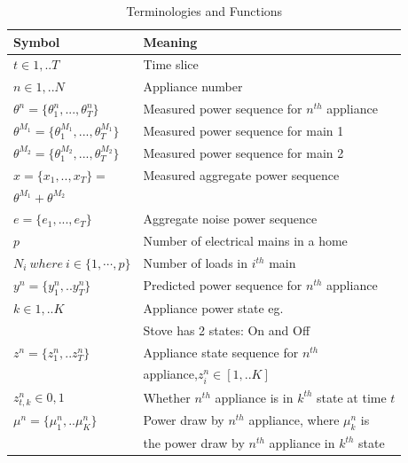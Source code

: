 \documentclass[conference]{IEEEtran}
\begin{document}
\begin{table}[ht!]
\vspace{-12pt}
\caption{Terminologies and Functions}
\vspace{-8pt}
\label{tab:terms}
\begin{tabular}{|l|l|}
\hline
Symbol&Meaning\\
\hline
$t\in {1,..T}$& Time slice\\
\hline
$n\in{1,..N}$ & Appliance number\\
\hline
$\theta^n=\{\theta_1^n,...,\theta_T^n\}$ & Measured power sequence for $n^{th}$ appliance\\
\hline
$\theta^{M_1}=\{\theta_1^{M_1},...,\theta_T^{M_1}\}$ & Measured power sequence for main 1\\[0.1cm]
\hline
$\theta^{M_2}=\{\theta_1^{M_2},...,\theta_T^{M_2}\}$ & Measured power sequence for main 2\\[0.1cm]
\hline
$x=\{ x_1,..,x_T\}=$ & Measured aggregate power sequence\\[0.1cm]
$\theta^{M_1}+\theta^{M_2}$ &\\
\hline
$e=\{e_1,...,e_T\}$ & Aggregate noise power sequence\\
\hline
$p$ & Number of electrical mains in a home\\
\hline
$N_i \:where\:i \in \{1,\cdots ,p\}$ & Number of loads in $i^{th}$ main\\
\hline
$y^n=\{y_1^n,..y_T^n\}$ & Predicted power sequence for $n^{th}$ appliance\\[0.1cm]
\hline
$k\in {1,..K}$ & Appliance power state eg. \\
&Stove has 2 states: On and Off\\[0.1cm]
\hline
$z^n=\{z_1^n,..z_T^n\}$ & Appliance state sequence for $n^{th}$ \\[0.1cm]
& appliance,$z_i^n \in [1,..K]$\\[0.1cm]
\hline
$z_{t,k}^n \in{0,1}$ & Whether $n^{th}$ appliance is in $k^{th}$ state at time $t$\\[0.1cm]
\hline 
$\mu^n=\{\mu_1^n,..\mu_K^n\}$ & Power draw by $n^{th}$ appliance, where $\mu_k^n$ is\\
&  the power draw by $n^{th}$ appliance in $k^{th}$ state\\[0.1cm]

\end{tabular}
\end{table}
\end{document}
